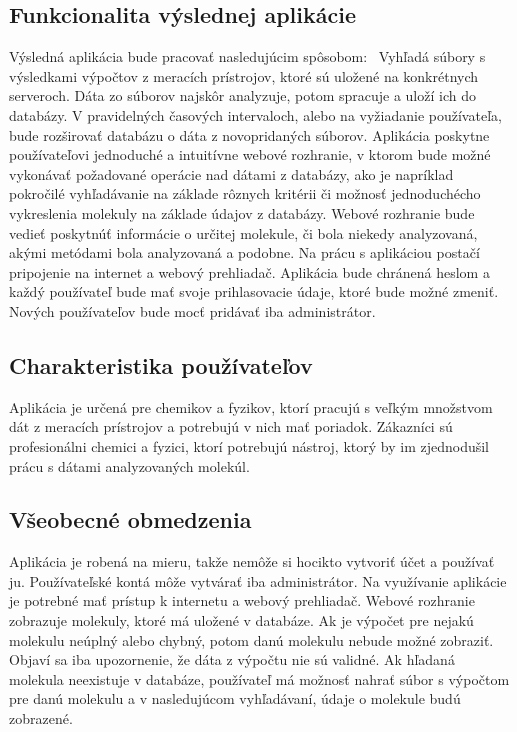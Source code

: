 \documentclass[12pt,a4paper]{article}
\begin{document}
\subsection{Funkcionalita výslednej aplikácie}
Výsledná aplikácia bude pracovať nasledujúcim spôsobom: \
Vyhľadá súbory s výsledkami výpočtov z meracích prístrojov, ktoré sú uložené na konkrétnych serveroch. Dáta zo súborov najskôr analyzuje, potom spracuje a uloží ich do databázy.
V pravidelných časových intervaloch, alebo na vyžiadanie používateľa, bude rozširovať databázu o dáta z novopridaných súborov. Aplikácia poskytne používateľovi jednoduché a intuitívne webové rozhranie, v ktorom bude možné vykonávať požadované operácie nad dátami z databázy, ako je napríklad pokročilé vyhľadávanie na základe rôznych kritérii či možnosť jednoduchécho vykreslenia molekuly na základe údajov z databázy. Webové rozhranie bude vedieť poskytnúť informácie o určitej molekule, či bola niekedy analyzovaná, akými metódami bola analyzovaná a podobne. Na prácu s aplikáciou postačí pripojenie na internet a webový prehliadač. Aplikácia bude chránená heslom a každý používateľ bude mať svoje prihlasovacie údaje, ktoré bude možné zmeniť. Nových používateľov bude mocť pridávať iba administrátor.

\subsection{Charakteristika používateľov}
Aplikácia je určená pre chemikov a fyzikov, ktorí pracujú s veľkým množstvom dát z meracích prístrojov a potrebujú v nich mať poriadok. Zákazníci sú profesionálni chemici a fyzici, ktorí potrebujú nástroj, ktorý by im zjednodušil prácu s dátami analyzovaných molekúl.

\subsection{Všeobecné obmedzenia}
Aplikácia je robená na mieru, takže nemôže si hocikto vytvoriť účet a používať ju. Používateľské kontá môže vytvárať iba administrátor. Na využívanie aplikácie je potrebné mať prístup k internetu a webový prehliadač. Webové rozhranie zobrazuje molekuly, ktoré má uložené v databáze. Ak je výpočet pre nejakú molekulu neúplný alebo chybný, potom danú molekulu nebude možné zobraziť. Objaví sa iba upozornenie, že dáta z výpočtu nie sú validné. Ak hľadaná molekula neexistuje v databáze, používateľ má možnosť nahrať súbor s výpočtom pre danú molekulu a v nasledujúcom vyhľadávaní, údaje o molekule budú zobrazené.
\end{document}
